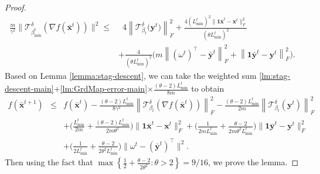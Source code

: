 \documentclass{article}
\newcommand{\cT}{\mathcal{T}}
\newcommand{\ctdb}{\mathcal{T}^\delta_{\beta_t}}
\newcommand{\bxt}{\mathbf{x}^t}
\newcommand{\byt}{\mathbf{y}^t}
\newcommand{\bbxt}{\bar{\mathbf{x}}^t}
\newcommand{\bbxte}{\bar{\mathbf{x}}^{t+1}}
\newcommand{\bbyt}{\bar{\mathbf{y}}^t}
\newcommand{\bone}{\mathbf{1}}
\begin{document}
\begin{proof}
\begin{align}
\label{lm:GrdMap-error-main}
\frac{m}{\gamma^2}\big\|\cT_{\beta_{\min}^t}^\delta(\nabla f(\bbxt))\big\|^2 \leq & \,\,\, 4\left\|\ctdb\big(\byt\big)\right\|_{F}^2 + \frac{4(L_{\min}^t)^2\big\|\bone\bbxt-\bxt\big\|_{F}^2}{(\theta L_{\min}^t)^2} \\
& + \frac{4}{(\theta L_{\min}^t)^2} \Big(m\left\|(\omega^t)^{\top} -  \bbyt\right\|_{F}^2 + \left\|\bone\bbyt - \byt\right\|_{F}^2\Big).  \nonumber
\end{align}  
Based on Lemma \ref{lemma:stag-descent}, we can take the weighted sum \eqref{lm:stag-descent-main}$+$\eqref{lm:GrdMap-error-main}$\times\frac{(\theta-2)L_{\min}^t}{8m}$ to obtain
\begin{eqnarray}
\label{lm:stag-descent-5}
f(\bbxte) &\leq& f(\bbxt)  -  \frac{(\theta-2)L_{\min}^t}{8\gamma^2} \left\|\ctdb(\nabla f(\bbxt))\right\|_F^2  -  \frac{(\theta-2)L_{\min}^t}{2m}\left\|\ctdb(\byt)\right\|_F^2 \\
&& +  \Big(\frac{L_{\text{min}}^t}{2m} + \frac{(\theta-2)L_{\min}^t}{2m\theta^2}\Big)\|\mathbf{1}\bar{\mathbf{x}}^t-\mathbf{x}^t\|^2_F  
 + \Big(\frac{1}{2mL_{\min}^t} + \frac{\theta-2}{2m\theta^2L_{\min}^t}\Big)\|\bone\bbyt - \byt\|^2_F\nonumber \\
 & &+ \Big(\frac{1}{2 L_{\min}^t}+\frac{\theta-2}{2\theta^2 L_{\min}^t}\Big)\|\omega^t-(\bbyt)^\top\|^2   \nonumber. 
\end{eqnarray} 
Then using the fact that $\max\left\{\frac{1}{2}+\frac{\theta-2}{2\theta^2}:\theta>2\right\} = 9/16$, we prove the lemma. 
\end{proof}
\end{document}
